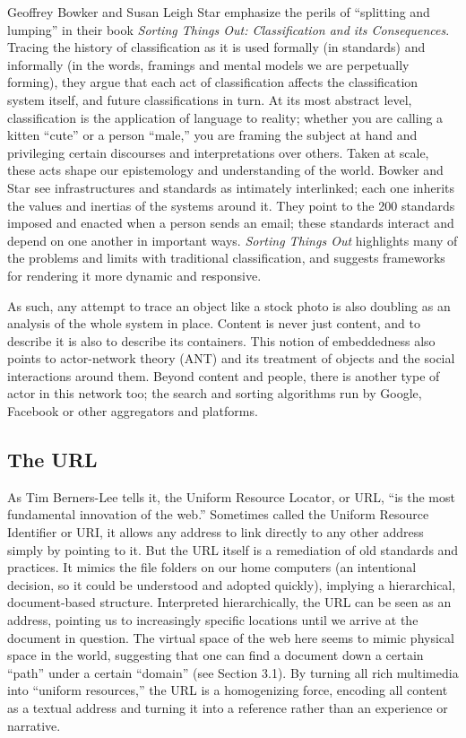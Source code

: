 Geoffrey Bowker and Susan Leigh Star emphasize the perils of ``splitting and lumping'' in their book \emph{Sorting Things Out: Classification and its Consequences}. Tracing the history of classification as it is used formally (in standards) and informally (in the words, framings and mental models we are perpetually forming), they argue that each act of classification affects the classification system itself, and future classifications in turn. At its most abstract level, classification is the application of language to reality; whether you are calling a kitten ``cute'' or a person ``male,'' you are framing the subject at hand and privileging certain discourses and interpretations over others. Taken at scale, these acts shape our epistemology and understanding of the world. Bowker and Star see infrastructures and standards as intimately interlinked; each one inherits the values and inertias of the systems around it. They point to the 200 standards imposed and enacted when a person sends an email; these standards interact and depend on one another in important ways.\autocite[7]{bowker_sorting_2000} \emph{Sorting Things Out} highlights many of the problems and limits with traditional classification, and suggests frameworks for rendering it more dynamic and responsive.

As such, any attempt to trace an object like a stock photo is also doubling as an analysis of the whole system in place. Content is never just content, and to describe it is also to describe its containers. This notion of embeddedness also points to actor-network theory (ANT) and its treatment of objects and the social interactions around them. Beyond content and people, there is another type of actor in this network too; the search and sorting algorithms run by Google, Facebook or other aggregators and platforms.

\subsection{The URL}

As Tim Berners-Lee tells it, the Uniform Resource Locator, or URL, ``is the most fundamental innovation of the web.''\autocite[39]{berners-lee_weaving_2000} Sometimes called the Uniform Resource Identifier or URI, it allows any address to link directly to any other address simply by pointing to it. But the URL itself is a remediation of old standards and practices. It mimics the file folders on our home computers (an intentional decision, so it could be understood and adopted quickly), implying a hierarchical, document-based structure. Interpreted hierarchically, the URL can be seen as an address, pointing us to increasingly specific locations until we arrive at the document in question. The virtual space of the web here seems to mimic physical space in the world, suggesting that one can find a document down a certain ``path'' under a certain ``domain'' (see Section 3.1). By turning all rich multimedia into ``uniform resources,'' the URL is a homogenizing force, encoding all content as a textual address and turning it into a reference rather than an experience or narrative.

